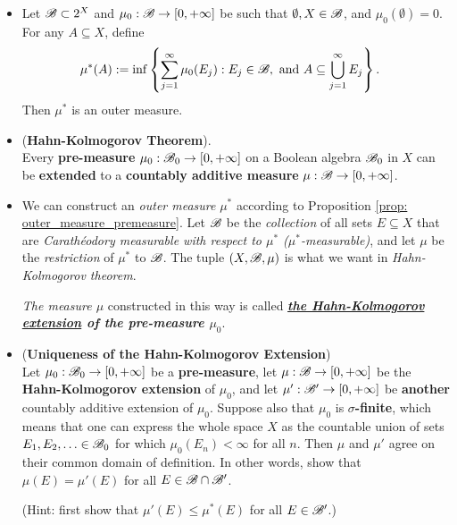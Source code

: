 \documentclass[11pt]{article}
\begin{document}
\begin{itemize}
\item \begin{proposition} \label{prop: outer_measure_premeasure}
Let ${\mathscr B} \subset 2^X$ and $\mu_0: {\mathscr B} \rightarrow [0, +\infty]$ be such that $\emptyset, X \in {\mathscr B}$, and $\mu_0(\emptyset) = 0$. For any $A \subseteq X$, define 
\begin{align*}
\mu^{*}(A) &:= \inf\left\{\sum_{j=1}^{\infty}\mu_0(E_j): E_j \in {\mathscr B}, \text{ and } A \subseteq \bigcup_{j=1}^{\infty}E_j\right\}. 
\end{align*} Then $\mu^{*}$ is an outer measure. 
\end{proposition}

\item \begin{theorem} (\textbf{Hahn-Kolmogorov Theorem}).\\
Every \textbf{pre-measure} $\mu_0 : {\mathscr B}_0 \rightarrow [0, +\infty]$  on a Boolean algebra ${\mathscr B}_{0}$ in $X$ can be \textbf{extended} to a \textbf{countably additive measure} $\mu : {\mathscr B} \rightarrow [0, +\infty]$.
\end{theorem}

\item \begin{remark}
We can construct an \emph{outer measure} $\mu^{*}$ according to Proposition \ref{prop: outer_measure_premeasure}. Let ${\mathscr B}$ be the \emph{collection} of all sets $E \subseteq X$ that are \textit{Carath\'eodory measurable with respect to $\mu^{*}$ ($\mu^{*}$-measurable)}, and let $\mu$ be the \emph{restriction} of $\mu^{*}$  to ${\mathscr B}$. The tuple $(X, {\mathscr B}, \mu)$ is what we want in \emph{Hahn-Kolmogorov theorem}. 

\emph{The measure $\mu$} constructed in this way is called \emph{\textbf{ \underline{the Hahn-Kolmogorov extension} of the pre-measure $\mu_0$}}. 
\end{remark}

\item \begin{proposition} (\textbf{Uniqueness of the Hahn-Kolmogorov Extension})\\
Let $\mu_0 : {\mathscr B}_0 \rightarrow [0, +\infty]$ be a \textbf{pre-measure}, let $\mu : {\mathscr B} \rightarrow [0, +\infty]$ be the \textbf{Hahn-Kolmogorov extension} of $\mu_0$, and let $\mu' : {\mathscr B}' \rightarrow  [0, +\infty]$ be \textbf{another} countably additive extension of $\mu_0$. Suppose also that $\mu_0$ is \textbf{$\sigma$-finite}, which means that one can express the whole space $X$ as the countable union of sets $E_1, E_2, \ldots \in {\mathscr B}_{0}$ for which $\mu_0(E_n) < \infty$ for all $n$. Then $\mu$ and $\mu'$ agree on their common domain of definition. In other words, show that  $\mu(E) = \mu'(E)$ for all $E \in {\mathscr B} \cap {\mathscr B}'$.
\end{proposition} (Hint: first show that $\mu'(E) \le \mu^{*}(E)$ for all $E \in {\mathscr B}'$.)


\end{itemize}
\end{document}
